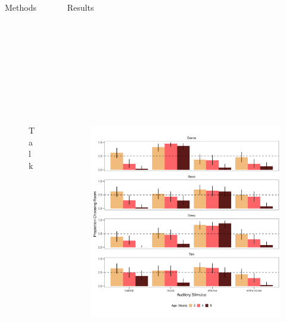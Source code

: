 \documentclass[final]{beamer}
\newlength{\sepwidth}
\newlength{\colwidth}
\newcommand{\separatorcolumn}{\begin{column}{\sepwidth}\end{column}}
\begin{document}
\begin{frame}[t]
\begin{columns}[t]
\begin{column}{\colwidth}
\begin{block}{Methods}
\begin{figure}
\begin{minipage}[t]{0.2\linewidth}
        \includegraphics[width=1.5in, height=1.75in]{figures/terb.png}
        \caption{Talk}
      \end{minipage}
    \end{figure}
    
  \end{block}

\end{column}

\separatorcolumn

\begin{column}{\colwidth}

  \begin{block}{Results}

    \begin{figure}
      \includegraphics[width = 14in, height = 7in]{../writeup/figs/e3b_bar_edits.pdf}
    \end{figure}


\end{block}
\end{column}
\end{columns}
\end{frame}
\end{document}
